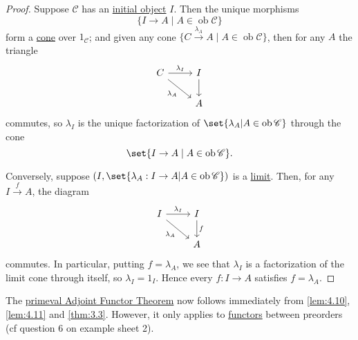\documentclass{article}
\DeclareMathOperator{\ob}{ob}
\begin{document}
\begin{proof}
  Suppose $\mathscr{C}$ has an \hyperlink{def:initial}{initial object} $I$.
  Then the unique morphisms
  \begin{equation*}\{I \to A \mid A \in \ob \mathscr{C}\}\end{equation*}
  form a \hyperlink{def:cone}{cone} over $1_\mathscr{C}$; and given any cone $\{C \xrightarrow{\lambda_A} A \mid A \in \ob \mathscr{C}\}$, then for any $A$ the triangle
  \begin{equation*}
    \begin{tikzcd}
      C \rar{\lambda_I} \drar[']{\lambda_A} & I \dar \\& A
    \end{tikzcd}
  \end{equation*}
  commutes, so $\lambda_I$ is the unique factorization of $\set{\lambda_A | A \in \ob \mathscr{C}}$ through the cone \begin{equation*}\set{I \to A \mid A \in \ob \mathscr{C}}.\end{equation*}

  Conversely, suppose $(I, \set{\lambda_A: I \to A| A \in \ob \mathscr{C}})$ is a \hyperlink{def:limit}{limit}.
  Then, for any $I \xrightarrow{f} A$, the diagram
  \begin{equation*}
    \begin{tikzcd}
      I \rar{\lambda_I} \drar[']{\lambda_A} & I \dar{f} \\ & A
    \end{tikzcd}
  \end{equation*}
  commutes.
  In particular, putting $f = \lambda_A$, we see that $\lambda_I$ is a factorization of the limit cone through itself, so $\lambda_I = 1_I$.
  Hence every $f: I \to A$ satisfies $f = \lambda_A$.
\end{proof}

The \hyperlink{thm:paft}{primeval Adjoint Functor Theorem} now follows immediately from \cref{lem:4.10}, \cref{lem:4.11} and \cref{thm:3.3}.
However, it only applies to \hyperlink{def:funct}{functors} between preorders (cf question 6 on example sheet 2).
\end{document}
